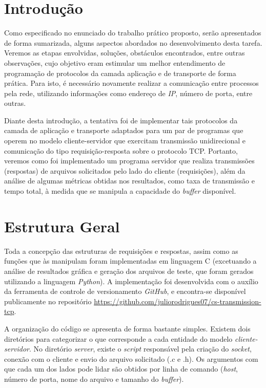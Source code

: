 \documentclass[a4paper, 12pt]{article}
\begin{document}
\tableofcontents
\newpage
\section{Introdução}

Como especificado no enunciado do trabalho prático proposto, serão apresentados de forma sumarizada, alguns aspectos abordados no desenvolvimento desta tarefa. Veremos as etapas envolvidas, soluções, obstáculos encontrados, entre outras observações, cujo objetivo eram estimular um melhor entendimento de programação de protocolos da camada aplicação e de transporte de forma prática. Para isto, é necessário novamente realizar a comunicação entre processos pela rede, utilizando informações como endereço de \emph{IP}, número de porta, entre outras.

Diante desta introdução, a tentativa foi de implementar tais protocolos da camada de aplicação e transporte adaptados para um par de programas que operem no modelo cliente-servidor que exercitam transmissão unidirecional e comunicação do tipo requisição-resposta sobre o protocolo TCP. Portanto, veremos como foi implementado um programa servidor que realiza transmissões (respostas) de arquivos solicitados pelo lado do cliente (requisições), além da análise de algumas métricas obtidas nos resultados, como taxa de transmissão e tempo total, à medida que se manipula a capacidade do \emph{buffer} disponível. 

\section{Estrutura Geral}

Toda a concepção das estruturas de requisições e respostas, assim como as funções que às manipulam foram implementadas em linguagem C (excetuando a análise de resultados gráfica e geração dos arquivos de teste, que foram gerados utilizando a linguagem \emph{Python}). A implementação foi desenvolvida com o auxílio da ferramenta de controle de versionamento \emph{GitHub}, e encontra-se disponível publicamente no repositório \url{https://github.com/juliorodrigues07/cs-transmission-tcp}.

A organização do código se apresenta de forma bastante simples. Existem dois diretórios para categorizar o que corresponde a cada entidade do modelo \emph{cliente-servidor}. No diretório \emph{server}, existe o \emph{script} responsável pela criação do \emph{socket}, conexão com o cliente e envio do arquivo solicitado (.c e .h). Os argumentos com que cada um dos lados pode lidar são obtidos por linha de comando (\emph{host}, número de porta, nome do arquivo e tamanho do \emph{buffer}).
\end{document}
